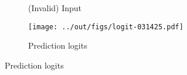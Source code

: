 \begin{figure}[H]
    \centering
    \begin{subfigure}[b]{3cm}
        \begin{center}
        \end{center}
        \caption{(Invalid) Input}
    \end{subfigure}%
    \quad
    \begin{subfigure}[b]{3cm}
        \begin{center}
            \texttt{[image: ../out/figs/logit-031425.pdf]}
        \end{center}
        \caption{Prediction logits}
    \end{subfigure}
\end{figure}